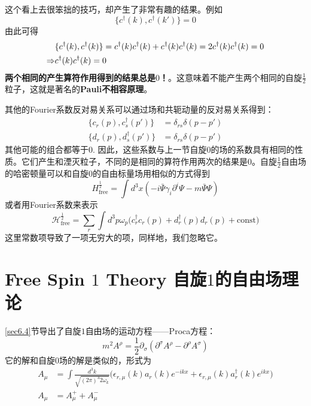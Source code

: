 这个看上去很笨拙的技巧，却产生了非常有趣的结果。例如
$$\{c^{\dagger}(k),c^{\dagger}(k') \}=0$$
由此可得
\begin{align}
	&\{ c^{\dagger}(k),c^{\dagger}(k) \}=c^{\dagger}(k)c^{\dagger}(k)+c^{\dagger}(k)c^{\dagger}(k)=2c^{\dagger}(k)c^{\dagger}(k)=0 \notag \\
	\Rightarrow &c^{\dagger}(k)c^{\dagger}(k)=0 \label{equ9.38}
\end{align}
{\bfseries 两个相同的产生算符作用得到的结果总是$0$！}。这意味着不能产生两个相同的自旋$\frac{1}{2}$粒子，这就是著名的{\bfseries Pauli不相容原理}。


其他的Fourier系数反对易关系可以通过场和共轭动量的反对易关系得到：
\begin{equation} \label{equ9.39}
\begin{split}
	\{c_{r}(p),c_{s}^{\dagger}(p') \} &= \delta_{rs}\delta(p-p') \\  
	\{d_{r}(p),d_{s}^{\dagger}(p') \} &= \delta_{rs}\delta(p-p') 
\end{split}
\end{equation}
其他可能的组合都等于$0$. 因此，这些系数与上一节自旋$0$的场的系数具有相同的性质。它们产生和湮灭粒子，不同的是相同的算符作用两次的结果是$0$。自旋$\frac{1}{2}$自由场的哈密顿量可以和自旋$0$的自由标量场用相似的方式得到
\begin{equation} \label{equ9.40}
	H^{\frac{1}{2}}_{\text{free}}=\int d^{3}x(-i\bar{\Psi}\gamma_{i}\partial^{i} \Psi-m\bar{\Psi}\Psi)
\end{equation}
或者用Fourier系数来表示
\begin{equation} \label{equ9.41}
	\mathscr{H}^{\frac{1}{2}}_{\text{free}} = \sum_{r}\int d^{3}p \omega_{p} \Big( c_{r}^{\dagger}c_{r}(p)+d^{\dagger}_{r}(p)d_{r}(p) + \text{const} \Big)
\end{equation}
这里常数项导致了一项无穷大的项，同样地，我们忽略它。

\section[自旋$1$的自由场理论]{Free Spin $1$ Theory \quad 自旋$1$的自由场理论}
\label{sec9.4}
\ref{sec6.4}节导出了自旋$1$自由场的运动方程——Proca方程：
\begin{equation} \label{equ9.42}
	m^{2}A^{\rho}=\frac{1}{2}\partial_{\sigma}(\partial^{\sigma}A^{\rho}-\partial^{\rho}A^{\sigma})
\end{equation}
它的解和自旋$0$场的解是类似的，形式为
\begin{align} 
	A_{\mu} &= \int \frac{d^{3}k}{ \sqrt{(2\pi)^{3}2\omega_{k}}}\Big( \epsilon_{r,\mu}(k) a_{r}(k)e^{-ikx}+\epsilon_{r,\mu}(k)a_{r}^{\dagger}(k)e^{ikx} \Big) \label{equ9.43} \\
	A_{\mu} &= A^{+}_{\mu}+A^{-}_{\mu} \label{equ9.44}
\end{align}

